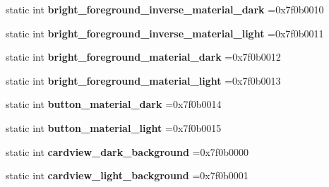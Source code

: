 \begin{DoxyCompactItemize}
\item 
\mbox{\label{classandroid_1_1support_1_1design_1_1R_1_1color_a49cc956850b8adcaba0d1c4e63cee226}} 
static int {\bfseries bright\+\_\+foreground\+\_\+inverse\+\_\+material\+\_\+dark} =0x7f0b0010
\item 
\mbox{\label{classandroid_1_1support_1_1design_1_1R_1_1color_a1986a3462e7bf7c059ae22c16a5f222a}} 
static int {\bfseries bright\+\_\+foreground\+\_\+inverse\+\_\+material\+\_\+light} =0x7f0b0011
\item 
\mbox{\label{classandroid_1_1support_1_1design_1_1R_1_1color_ae21e2b3e734df09fb0ced4c70771d287}} 
static int {\bfseries bright\+\_\+foreground\+\_\+material\+\_\+dark} =0x7f0b0012
\item 
\mbox{\label{classandroid_1_1support_1_1design_1_1R_1_1color_a242d973d3a1f65245c79f86ca710c02a}} 
static int {\bfseries bright\+\_\+foreground\+\_\+material\+\_\+light} =0x7f0b0013
\item 
\mbox{\label{classandroid_1_1support_1_1design_1_1R_1_1color_abf30f26182fc80130d31bf77ce6a6a7f}} 
static int {\bfseries button\+\_\+material\+\_\+dark} =0x7f0b0014
\item 
\mbox{\label{classandroid_1_1support_1_1design_1_1R_1_1color_ab435977065f8a9cec0836bd1f04807fa}} 
static int {\bfseries button\+\_\+material\+\_\+light} =0x7f0b0015
\item 
\mbox{\label{classandroid_1_1support_1_1design_1_1R_1_1color_a7d42471893e65c5118dca80e2805e1f5}} 
static int {\bfseries cardview\+\_\+dark\+\_\+background} =0x7f0b0000
\item 
\mbox{\label{classandroid_1_1support_1_1design_1_1R_1_1color_aac9c3cd820dc801e4bab6e55f1111c43}} 
static int {\bfseries cardview\+\_\+light\+\_\+background} =0x7f0b0001
\item 
\mbox{\label{classandroid_1_1support_1_1design_1_1R_1_1color_a623cfca4ac95cc0d7b8c7f38746c1378}} 

\end{DoxyCompactItemize}
